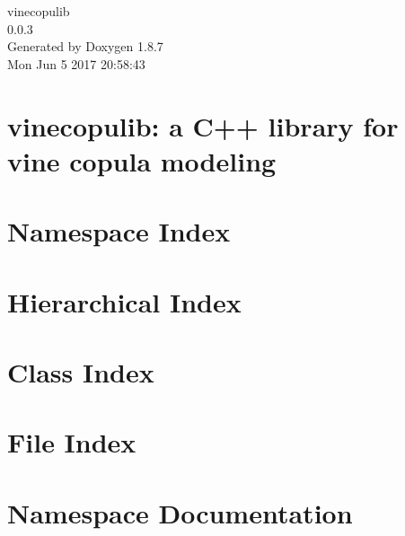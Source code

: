 \documentclass[twoside]{book}
\newcommand{\+}{\discretionary{\mbox{\scriptsize$\hookleftarrow$}}{}{}}
\newcommand{\clearemptydoublepage}{%
  \newpage{\pagestyle{empty}\cleardoublepage}%
}
\begin{document}
\hypersetup{pageanchor=false,
             bookmarks=true,
             bookmarksnumbered=true,
             pdfencoding=unicode
            }
\begin{titlepage}
\vspace*{7cm}
\begin{center}%
{\Large vinecopulib \\[1ex]\large 0.\+0.\+3 }\\
\vspace*{1cm}
{\large Generated by Doxygen 1.8.7}\\
\vspace*{0.5cm}
{\small Mon Jun 5 2017 20:58:43}\\
\end{center}
\end{titlepage}
\clearemptydoublepage
\tableofcontents
\clearemptydoublepage
{}
\hypersetup{pageanchor=true}

\chapter{vinecopulib\+: a C++ library for vine copula modeling}
\label{index}\hypertarget{index}{}
\chapter{Namespace Index}

\chapter{Hierarchical Index}

\chapter{Class Index}

\chapter{File Index}

\chapter{Namespace Documentation}





\end{document}
